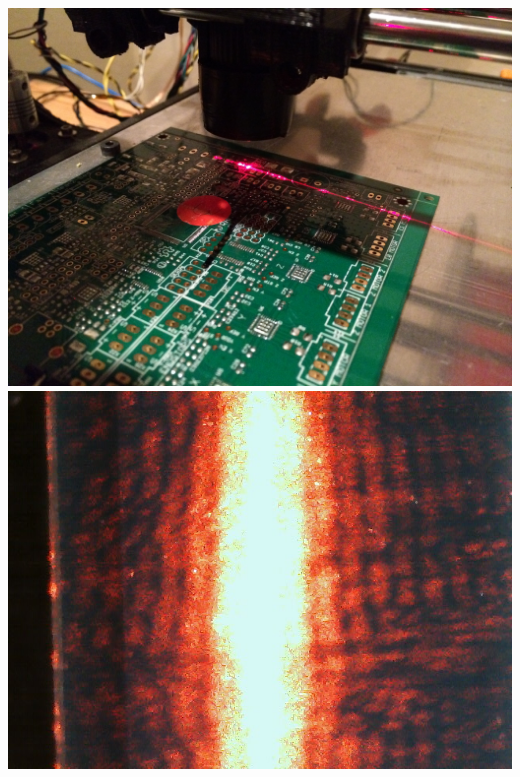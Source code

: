 \documentclass[12pt]{article}
\begin{document}
\newpage







\includegraphics[scale=0.1]{images/volume_analysis_setup/IMG_0606.JPG}
\newpage
\includegraphics{images/volume_analysis_setup/laser-8}
\newpage
\end{document}
